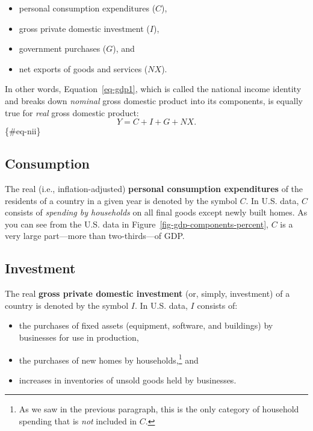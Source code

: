 \documentclass[
  letterpaper,
]{book}
\providecommand{\tightlist}{%
  \setlength{\itemsep}{0pt}\setlength{\parskip}{0pt}}\usepackage{longtable,booktabs,array}
\begin{document}
\begin{itemize}
\tightlist
\item
  personal consumption expenditures (\(C\)),
\item
  gross private domestic investment (\(I\)),
\item
  government purchases (\(G\)), and
\item
  net exports of goods and services (\(NX\)).
\end{itemize}

In other words, Equation~\ref{eq-gdp1}, which is called the national
income identity and breaks down \emph{nominal} gross domestic product
into its components, is equally true for \emph{real} gross domestic
product: \begin{equation}
Y=C+I+G+NX.
\end{equation} \{\#eq-nii\}

\subsection{Consumption}\label{sec-consumption-nia}


The real (i.e., inflation-adjusted) \textbf{personal consumption
expenditures} of the residents of a country in a given year is denoted
by the symbol \(C\). In U.S. data, \(C\) consists of \emph{spending by
households} on all final goods except newly built homes. As you can see
from the U.S. data in Figure~\ref{fig-gdp-components-percent}, \(C\) is
a very large part---more than two-thirds---of GDP.

\subsection{Investment}\label{sec-investment-nia}


The real \textbf{gross private domestic investment} (or, simply,
investment) of a country is denoted by the symbol \(I\). In U.S. data,
\(I\) consists of:

\begin{itemize}
\tightlist
\item
  the purchases of fixed assets (equipment, software, and buildings) by
  businesses for use in production,
\item
  the purchases of new homes by households,\footnote{As we saw in the
    previous paragraph, this is the only category of household spending
    that is \emph{not} included in \(C\).} and
\item
  increases in inventories of unsold goods held by businesses.
\end{itemize}
\end{document}
